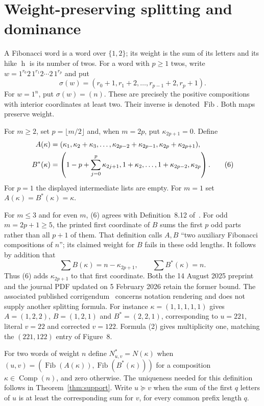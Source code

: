 \documentclass[11pt]{article}
\newcommand{\Fib}{\operatorname{Fib}}
\newcommand{\Comp}{\operatorname{Comp}}
\newcommand{\hik}{\operatorname{h}}
\begin{document}
\section{Weight-preserving splitting and dominance}
A Fibonacci word is a word over $\{1,2\}$; its weight is the sum of its
letters and its hike $\hik$ is its number of twos. For a word with
$p\ge1$ twos, write
$w=1^{r_0}2\,1^{r_1}2\cdots2\,1^{r_p}$ and put
\[
 \sigma(w)=(r_0+1,r_1+2,\ldots,r_{p-1}+2,r_p+1).
 \tag{5}
\]
For $w=1^n$, put $\sigma(w)=(n)$. These are precisely the positive
compositions with interior coordinates at least two. Their inverse is
denoted $\Fib$. Both maps preserve weight.

For $m\ge2$, set $p=\lfloor m/2\rfloor$ and, when $m=2p$, put
$\kappa_{2p+1}=0$. Define
\begin{align}
 A(\kappa)&=(\kappa_1,\kappa_2+\kappa_3,
             \ldots,\kappa_{2p-2}+\kappa_{2p-1},
             \kappa_{2p}+\kappa_{2p+1}),\notag\\
 B^*(\kappa)&=\left(1-p+\sum_{j=0}^{p}\kappa_{2j+1},
                    1+\kappa_2,\ldots,1+\kappa_{2p-2},\kappa_{2p}\right).
 \tag{6}
\end{align}
For $p=1$ the displayed intermediate lists are empty. For $m=1$ set
$A(\kappa)=B^*(\kappa)=\kappa$.

For $m\le3$ and for even $m$, (6) agrees with Definition~8.12
of~\cite{PS}. For odd $m=2p+1\ge5$, the printed first coordinate of
$B$ sums the first $p$ odd parts rather than all $p+1$ of them.
That definition calls $A,B$ ``two auxiliary Fibonacci compositions of
$n$''; its claimed weight for $B$ fails in these odd lengths.
It follows by addition that
\[
 \sum B(\kappa)=n-\kappa_{2p+1},\qquad
 \sum B^*(\kappa)=n.
 \tag{7}
\]
Thus (6) adds $\kappa_{2p+1}$ to that first coordinate. Both the
14 August 2025 preprint and the journal PDF updated on 5 February 2026
retain the former bound. The associated published
corrigendum~\cite{PScorr} concerns notation rendering and does not
supply another splitting formula. For instance $\kappa=(1,1,1,1,1)$ gives
$A=(1,2,2)$, $B=(1,2,1)$ and $B^*=(2,2,1)$, corresponding to
$u=221$, literal $v=22$ and corrected $v=122$. Formula (2) gives
multiplicity one, matching the $(221,122)$ entry of Figure~8.

For two words of weight $n$ define $N^*_{u,v}=N(\kappa)$ when
$(u,v)=(\Fib(A(\kappa)),\Fib(B^*(\kappa)))$ for a composition
$\kappa\in\Comp(n)$, and zero otherwise. The uniqueness needed for
this definition follows in Theorem~\ref{thm:support}.
Write $u\succeq v$ when the sum of the first $q$ letters of $u$ is at
least the corresponding sum for $v$, for every common prefix length $q$.
\end{document}
